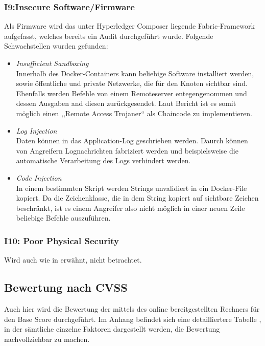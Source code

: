         \subsubsection*{I9:Insecure Software/Firmware}
            Als Firmware wird das unter Hyperledger Composer liegende Fabric-Framework aufgefasst, welches bereits ein Audit\cite{Shaw2017} durchgeführt wurde. 
            Folgende Schwachstellen wurden gefunden:
            \begin{itemize}[leftmargin=0cm,label={}]
    	        \item \emph{Insufficient Sandboxing}\cite{Shaw2017}\label{vuln:fabric_sandbox}\\
    	            Innerhalb des Docker-Containers kann beliebige Software installiert werden, sowie öffentliche und private Netzwerke, die für den Knoten sichtbar sind. 
    	            Ebenfalls werden Befehle von einem Remoteserver entegengenommen und dessen Ausgaben and diesen zurückgesendet. 
    	            Laut Bericht ist es somit möglich einen ,,Remote Access Trojaner`` als Chaincode zu implementieren.
    	        \item \emph{Log Injection}\cite{Shaw2017}\label{vuln:fabric_log_injection}\\
    	            Daten können in das Application-Log geschrieben werden.
    	            Daurch können von Angreifern Lognachrichten fabriziert werden und beispielsweise die automatische Verarbeitung des Logs verhindert werden. 
    	        \item \emph{Code Injection}\cite{Shaw2017}\label{vuln:fabric_code_injection}\\
    	            In einem bestimmten Skript werden Strings unvalidiert in ein Docker-File kopiert. 
    	            Da die Zeichenklasse, die in dem String kopiert auf sichtbare Zeichen beschränkt, ist es einem Angreifer also nicht möglich in einer neuen Zeile beliebige Befehle auszuführen.
            \end{itemize}
            
        \subsubsection*{I10: Poor Physical Security}
            Wird auch wie in  erwähnt, nicht betrachtet.
    
    \subsection{Bewertung nach CVSS}
    \label{sec:evaluation_cvss}
        Auch hier wird die Bewertung der  mittels des online bereitgestellten Rechners\cite{CvssCalc} für den Base Score durchgeführt. 
    	Im Anhang befindet sich eine detailliertere Tabelle , in der sämtliche einzelne Faktoren dargestellt werden, die Bewertung nachvollziehbar zu machen.
    
